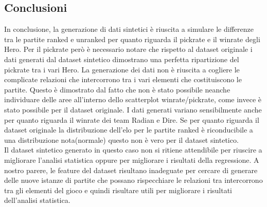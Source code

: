\subsection{Conclusioni}
In conclusione, la generazione di dati sintetici è riuscita a simulare le differenze tra le partite ranked e unranked per quanto riguarda il pickrate e il winrate degli Hero. Per il pickrate però è necessario notare che rispetto al dataset originale i dati generati dal dataset sintetico dimostrano una perfetta ripartizione del pickrate tra i vari Hero. %
La generazione dei dati non è riuscita a cogliere le complicate relazioni che intercorrono tra i vari elementi che costituiscono le partite. Questo è dimostrato dal fatto che non è stato possibile neanche individuare delle aree all'interno dello scatterplot winrate/pickrate, come invece è stato possibile per il dataset originale. I dati generati variano sensibilmente anche per quanto riguarda il winrate dei team Radian e Dire. 
Se per quanto riguarda il dataset originale la distribuzione dell'elo per le partite ranked è riconducibile a una distribuzione nota(normale) questo non è vero per il dataset sintetico. \\
Il dataset sintetico generato in questo caso non si ritiene attendibile per riuscire a migliorare l'analisi statistica oppure per migliorare i risultati della regressione. A nostro parere, le feature del dataset risultano inadeguate per cercare di generare delle nuove istanze di partite che possano rispecchiare le relazioni tra intercorrono tra gli elementi del gioco e quindi risultare utili per migliorare i risultati dell'analisi statistica.